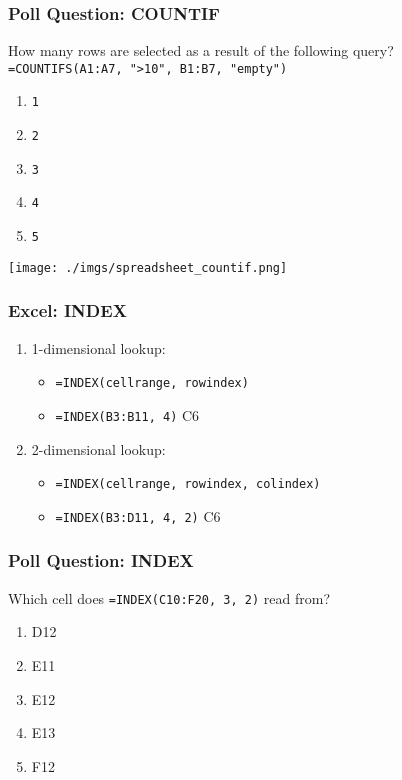 \documentclass{beamer}
\begin{document}
%
%
%
\begin{frame}[fragile]
  \frametitle{Poll Question: COUNTIF}
  How many rows are selected as a result of the following query?
  \lstinline|=COUNTIFS(A1:A7, ">10", B1:B7, "empty")|
  \vfill
  \begin{minipage}{0.48\textwidth}
  \begin{enumerate}[A]
    \item \lstinline|1|
    \item \lstinline|2|
    \item \lstinline|3|
    \item \lstinline|4|
    \item \lstinline|5|
  \end{enumerate}
  \end{minipage}
  \hfill
  \begin{minipage}{0.48\textwidth}
    \texttt{[image: ./imgs/spreadsheet\_countif.png]}
  \end{minipage}
\end{frame}


%
%
\begin{frame}[fragile]
  \frametitle{Excel: INDEX}
  \begin{enumerate}
    \item 1-dimensional lookup:
      \begin{itemize}
        \item \lstinline|=INDEX(cellrange, rowindex)|
        \item \lstinline|=INDEX(B3:B11, 4)| \textrightarrow C6
      \end{itemize}
    \item 2-dimensional lookup:
      \begin{itemize}
        \item \lstinline|=INDEX(cellrange, rowindex, colindex)|
        \item \lstinline|=INDEX(B3:D11, 4, 2)| \textrightarrow C6
      \end{itemize}
  \end{enumerate}
\end{frame}


%
%
\begin{frame}[fragile]
  \frametitle{Poll Question: INDEX}
  Which cell does \lstinline|=INDEX(C10:F20, 3, 2)| read from?
  \vfill
  \begin{enumerate}[A]
    \item D12
    \item E11
    \item E12
    \item E13
    \item F12
  \end{enumerate}
\end{frame}
\end{document}
